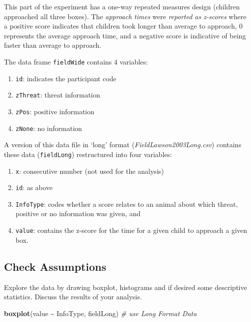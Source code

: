 \documentclass[
]{article}
\newenvironment{Shaded}{\begin{snugshade}}{\end{snugshade}}
\newcommand{\CommentTok}[1]{\textcolor[rgb]{0.56,0.35,0.01}{\textit{#1}}}
\newcommand{\FunctionTok}[1]{\textcolor[rgb]{0.13,0.29,0.53}{\textbf{#1}}}
\newcommand{\NormalTok}[1]{#1}
\newcommand{\SpecialCharTok}[1]{\textcolor[rgb]{0.81,0.36,0.00}{\textbf{#1}}}
\providecommand{\tightlist}{%
  \setlength{\itemsep}{0pt}\setlength{\parskip}{0pt}}
\begin{document}
This part of the experiment has a one-way repeated measures design (children approached all three boxes). The \emph{approach times} were \emph{reported as z-scores} where a positive score indicates that children took longer than average to approach, 0 represents the average approach time, and a negative score is indicative of being faster than average to approach.

The data frame \texttt{fieldWide} contains 4 variables:

\begin{enumerate}
\def\labelenumi{\arabic{enumi}.}
\tightlist
\item
  \texttt{id}: indicates the participant code
\item
  \texttt{zThreat}: threat information
\item
  \texttt{zPos}: positive information
\item
  \texttt{zNone}: no information
\end{enumerate}

A version of this data file in `long' format (\emph{FieldLawson2003Long.csv}) contains these data (\texttt{fieldLong}) restructured into four variables:

\begin{enumerate}
\def\labelenumi{\arabic{enumi}.}
\tightlist
\item
  \texttt{x}: consecutive number (not used for the analysis)
\item
  \texttt{id}: as above
\item
  \texttt{InfoType}: codes whether a score relates to an animal about which threat, positive or no information was given, and
\item
  \texttt{value}: contains the z-score for the time for a given child to approach a given box.
\end{enumerate}

\subsection*{Check Assumptions}\label{check-assumptions}

Explore the data by drawing boxplot, histograms and if desired some descriptive statistics. Discuss the results of your analysis.

\begin{Shaded}
\begin{Highlighting}[]
  \FunctionTok{boxplot}\NormalTok{(value }\SpecialCharTok{\textasciitilde{}}\NormalTok{ InfoType, fieldLong) }\CommentTok{\# use Long Format Data}
\end{Highlighting}
\end{Shaded}
\end{document}
